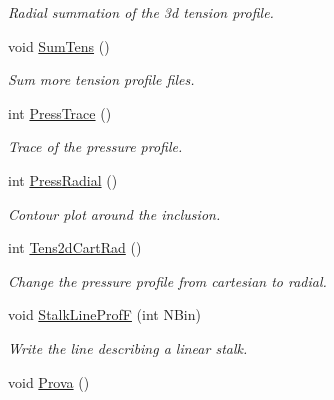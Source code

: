 \begin{DoxyCompactItemize}
\begin{DoxyCompactList}\small\item\em \-Radial summation of the 3d tension profile. \end{DoxyCompactList}\item 
\hypertarget{classElPoly_a35c812e3cfa8e0031dc2b521e075c1c9}{void \hyperlink{classElPoly_a35c812e3cfa8e0031dc2b521e075c1c9}{\-Sum\-Tens} ()}\label{classElPoly_a35c812e3cfa8e0031dc2b521e075c1c9}

\begin{DoxyCompactList}\small\item\em \-Sum more tension profile files. \end{DoxyCompactList}\item 
\hypertarget{classElPoly_a534f27d79203f0b018acaedf41bbdb13}{int \hyperlink{classElPoly_a534f27d79203f0b018acaedf41bbdb13}{\-Press\-Trace} ()}\label{classElPoly_a534f27d79203f0b018acaedf41bbdb13}

\begin{DoxyCompactList}\small\item\em \-Trace of the pressure profile. \end{DoxyCompactList}\item 
\hypertarget{classElPoly_a17a99c936b16e1880291e6c3c5957e44}{int \hyperlink{classElPoly_a17a99c936b16e1880291e6c3c5957e44}{\-Press\-Radial} ()}\label{classElPoly_a17a99c936b16e1880291e6c3c5957e44}

\begin{DoxyCompactList}\small\item\em \-Contour plot around the inclusion. \end{DoxyCompactList}\item 
\hypertarget{classElPoly_a7282d2e3fe0a3ee0caa631363913cc0a}{int \hyperlink{classElPoly_a7282d2e3fe0a3ee0caa631363913cc0a}{\-Tens2d\-Cart\-Rad} ()}\label{classElPoly_a7282d2e3fe0a3ee0caa631363913cc0a}

\begin{DoxyCompactList}\small\item\em \-Change the pressure profile from cartesian to radial. \end{DoxyCompactList}\item 
void \hyperlink{classElPoly_adbfe7fc41363f770eee9c2a9e0e1ed57}{\-Stalk\-Line\-Prof\-F} (int \-N\-Bin)
\begin{DoxyCompactList}\small\item\em \-Write the line describing a linear stalk. \end{DoxyCompactList}\item 
\hypertarget{classElPoly_a47cedfc639fa29b9812167b4fb5d1360}{void \hyperlink{classElPoly_a47cedfc639fa29b9812167b4fb5d1360}{\-Prova} ()}\label{classElPoly_a47cedfc639fa29b9812167b4fb5d1360}


\end{DoxyCompactItemize}
